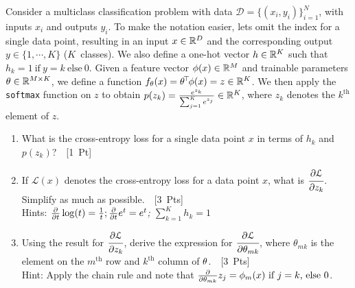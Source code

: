 

Consider a multiclass classification problem with data $\mathcal{D}=\{(x_i,y_i)\}_{i=1}^{N}$, with inputs $x_i$ and outputs $y_i$. To make the notation easier, lets omit the index for a single data point, resulting in an input $x \in {\mathbb{R}}^{D}$ and the corresponding output $y \in \{1, \cdots, K\}$ ($K$~classes). We also define a one-hot vector $h \in {\mathbb{R}}^K$ such that $h_k = 1 \ \text{if}\ y=k\ \text{else}\ 0$.
%
Given a feature vector $\phi(x) \in {\mathbb{R}}^{M}$ and trainable parameters $\theta \in {\mathbb{R}}^{M\times K}$, 
we define a function $f_{\theta}(x) = \theta^{\!\top\!} \phi(x) = z \in {\mathbb{R}}^{K}$. We then apply the \texttt{softmax} function on $z$ to obtain $p(z_k) = \frac{e^{z_k}}{\sum_{j=1}^{K} e^{z_j}} \in {\mathbb{R}}^{K}$, where $z_k$ denotes the $k^\text{th}$ element of $z$.

\begin{enumerate}
	\item What is the cross-entropy loss for a single data point $x$ in terms of $h_k$ and $p(z_k)$?~\hfill~[1~Pt]
	\item If $\mathcal{L}(x)$ denotes the cross-entropy loss for a data point $x$, what is $\cfrac{\partial \mathcal{L}}{\partial z_k}$. Simplify as much as possible.~\hfill~[3~Pts]\\
	Hints: \emph{$\frac{\partial}{\partial t}\log(t) = \frac{1}{t}; \frac{\partial}{\partial t}e^{t} = e^{t}$; $\sum_{k=1}^{K} h_k = 1$} 
	\item Using the result for $\cfrac{\partial \mathcal{L}}{\partial z_k}$, derive the expression for $\cfrac{\partial \mathcal{L}}{\partial \theta_{mk}}$, where $\theta_{mk}$ is the element on the $m^\text{th}$ row and $k^\text{th}$ column of $\theta$.~\hfill~[3~Pts]\\
	Hint: Apply the chain rule and note that $\frac{\partial}{\partial \theta_{mk}}z_j = \phi_m(x)\text{ if }j=k \text{, else }0$.
\end{enumerate}



